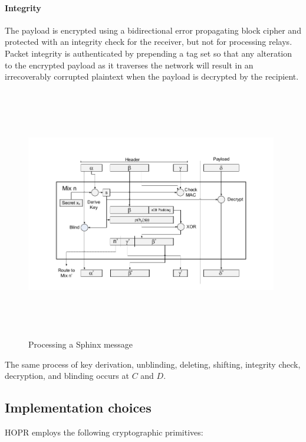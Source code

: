 \paragraph{Integrity}
The payload is encrypted using a bidirectional error propagating block cipher
and protected with an integrity check for the receiver, but not
for processing relays. Packet integrity is authenticated by prepending a tag set so that any alteration to the encrypted payload as it traverses the network will result in an irrecoverably corrupted plaintext when the payload is decrypted by the recipient.

\begin{figure}[H]
    \centering
    \includegraphics[width=11cm,height=11cm,keepaspectratio]{../yellowpaper/images/sphinx1.png}
    \caption{Processing a Sphinx message \cite{sphinxpaper}}
    \label{fig:The processing of a Sphinx message }
\end{figure}
The same process of key derivation, unblinding, deleting, shifting, integrity check, decryption, and blinding occurs at $C$ and $D$.

\subsection{Implementation choices}

HOPR employs the following cryptographic primitives:

